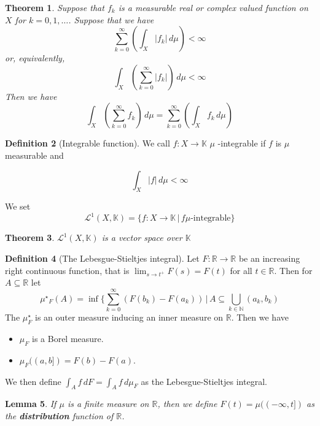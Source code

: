 \documentclass[10pt, oneside, reqno]{amsart}
\theoremstyle{plain}%
\newtheorem{thm}{Theorem}[section]
\newtheorem{lem}[thm]{Lemma}
\theoremstyle{definition}
\newtheorem{defn}[thm]{Definition}
\theoremstyle{remark}
\newcommand{\R}{\mathbb{R}}
\newcommand{\dmu}{\, d \mu}
\begin{document}
\begin{thm}
    Suppose that $f_k$ is a measurable real or complex valued function on $X$ for $k = 0,1,\dots$.  Suppose that we have \[
        \sum_{k = 0}^\infty \left(\int_X |f_k| \dmu \right) < \infty
    \] or, equivalently,
    \[
        \int_X \left( \sum_{k = 0}^\infty |f_k| \right) \dmu < \infty
    \]
    Then we have \[
    \int_X \left( \sum_{k = 0}^\infty f_k \right) \dmu =
    \sum_{k = 0}^\infty \left(\int_X f_k \dmu \right)   
    \]
\end{thm}



\begin{defn}[Integrable function]
    We call $f : X \rightarrow \mathbb{K}$ $\mu$ -integrable if $f$ is $\mu$ measurable and 
    
    \[
        \int_X |f| \, d \mu < \infty
    \]
    
    We set \[
        \mathcal{L}^1(X,\mathbb{K}) = \{ f : X \rightarrow \mathbb{K} \, | \, f \mu \text{-integrable} \}
    \]
\end{defn}

\begin{thm}
    $   \mathcal{L}^1(X,\mathbb{K})$ is a vector space over $\mathbb{K}$
\end{thm}


\begin{defn}[The Lebesgue-Stieltjes integral]
Let $F : \R \rightarrow \R$ be an increasing right continuous function, that is $\lim_{s \rightarrow t^+} F(s) = F(t)$ for all $t \in \R$.  Then for $A \subseteq \R$ let \[
    \mu{^\star}_F (A) = \inf \{ \sum_{k=0}^\infty (F(b_k) - F(a_k)) \, | \, A \subseteq \bigcup_{k \in \mathbb{N}} (a_k, b_k)
\]
The $\mu^\star_F$ is an outer measure inducing an inner measure on $\R$.  Then we have 
    \begin{itemize}
        \item $\mu_F$ is a Borel measure.
        \item $\mu_F((a,b]) = F(b) - F(a)$.
    \end{itemize}
    
    We then define $\int_A f \, dF = \int_A f \, d \mu_F $ as the Lebesgue-Stieltjes integral.
\end{defn}

\begin{lem}
    If $\mu$ is a finite measure on $\R$, then we define $F(t) = \mu((-\infty, t])$ as the \textbf{distribution} function of $\R$.
\end{lem}
\end{document}
